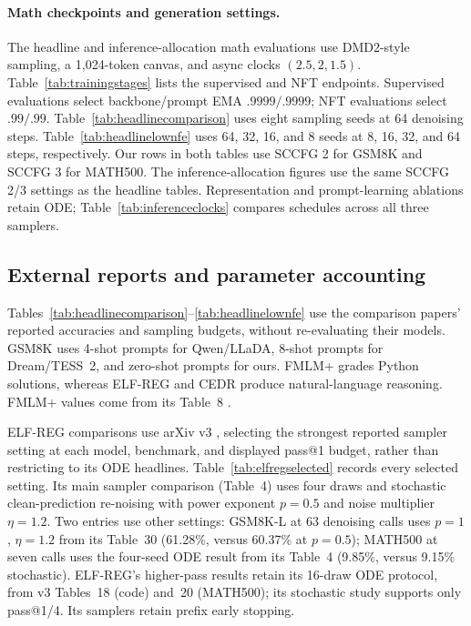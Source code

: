 \documentclass[11pt,letterpaper]{article}
\begin{document}
\paragraph{Math checkpoints and generation settings.}
The headline and inference-allocation math evaluations use DMD2-style sampling, a 1,024-token canvas, and async clocks $(2.5,2,1.5)$. Table~\ref{tab:trainingstages} lists the supervised and NFT endpoints. Supervised evaluations select backbone/prompt EMA $.9999/.9999$; NFT evaluations select $.99/.99$. Table~\ref{tab:headlinecomparison} uses eight sampling seeds at 64 denoising steps. Table~\ref{tab:headlinelownfe} uses 64, 32, 16, and 8 seeds at 8, 16, 32, and 64 steps, respectively. Our rows in both tables use SCCFG 2 for GSM8K and SCCFG 3 for MATH500. The inference-allocation figures use the same SCCFG 2/3 settings as the headline tables. Representation and prompt-learning ablations retain ODE; Table~\ref{tab:inferenceclocks} compares schedules across all three samplers.

\subsection{External reports and parameter accounting}
Tables~\ref{tab:headlinecomparison}--\ref{tab:headlinelownfe} use the comparison papers' reported accuracies and sampling budgets, without re-evaluating their models. GSM8K uses 4-shot prompts for Qwen/LLaDA, 8-shot prompts for Dream/TESS~2, and zero-shot prompts for ours. FMLM+ grades Python solutions, whereas ELF-REG and CEDR produce natural-language reasoning. FMLM+ values come from its Table~8 \citep{posterior}.

ELF-REG comparisons use arXiv v3 \citep{scalingdlm}, selecting the strongest reported sampler setting at each model, benchmark, and displayed pass@1 budget, rather than restricting to its ODE headlines. Table~\ref{tab:elfregselected} records every selected setting. Its main sampler comparison (Table~4) uses four draws and stochastic clean-prediction re-noising with power exponent $p=0.5$ and noise multiplier $\eta=1.2$. Two entries use other settings: GSM8K-L at 63 denoising calls uses $p=1$, $\eta=1.2$ from its Table~30 (61.28\%, versus 60.37\% at $p=0.5$); MATH500 at seven calls uses the four-seed ODE result from its Table~4 (9.85\%, versus 9.15\% stochastic). ELF-REG's higher-pass results retain its 16-draw ODE protocol, from v3 Tables~18 (code) and~20 (MATH500); its stochastic study supports only pass@1/4. Its samplers retain prefix early stopping.
\end{document}
